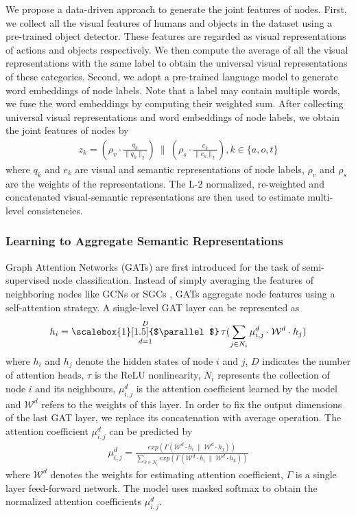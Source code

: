 \documentclass[sigconf,screen]{acmart}
\DeclareMathOperator*{\concat}{\scalebox{1}[1.5]{$\parallel$}}
\begin{document}
We propose a data-driven approach to generate the joint features of nodes. First, we collect all the visual features of humans and objects in the dataset using a pre-trained object detector. These features are regarded as visual representations of actions and objects respectively. We then compute the average of all the visual representations with the same label to obtain the universal visual representations of these categories. Second, we adopt a pre-trained language model to generate word embeddings of node labels. Note that a label may contain multiple words, we fuse the word embeddings by computing their weighted sum. After collecting universal visual representations and word embeddings of node labels, we obtain the joint features of nodes by
\begin{gather}
z_k = (\rho_v \cdot \frac{q_k}{\|q_k\|_2})\ \|\ (\rho_s \cdot \frac{e_k}{\|e_k\|_2}), k \in \{a, o, t\}
\end{gather}
where $q_k$ and $e_k$ are visual and semantic representations of node labels, $\rho_v$ and $\rho_s$ are the weights of the representations. The L-2 normalized, re-weighted and concatenated visual-semantic representations are then used to estimate multi-level consistencies.

\subsubsection{Learning to Aggregate Semantic Representations}

Graph Attention Networks (GATs) \cite{velickovic2018graph} are first introduced for the task of semi-supervised node classification. Instead of simply averaging the features of neighboring nodes like GCNs \cite{kipf2016semi} or SGCs \cite{wu2019simplifying}, GATs aggregate node features using a self-attention strategy. A single-level GAT layer can be represented as
\begin{gather}
h_i = \concat^D_{d = 1} \tau(\sum_{j \in N_i} \mu^d_{i, j} \cdot \mathcal{W}^d \cdot h_j)
\end{gather}
where $h_i$ and $h_j$ denote the hidden states of node $i$ and $j$, $D$ indicates the number of attention heads, $\tau$ is the ReLU nonlinearity, $N_i$ represents the collection of node $i$ and its neighbours, $\mu^d_{i, j}$ is the attention coefficient learned by the model and $\mathcal{W}^d$ refers to the weights of this layer. In order to fix the output dimensions of the last GAT layer, we replace its concatenation with average operation. The attention coefficient $\mu^d_{i, j}$ can be predicted by
\begin{gather}
\mu^d_{i, j} = \frac{exp(\Gamma(\mathcal{W}^d \cdot h_i\ \|\ \mathcal{W}^d \cdot h_j))}{\sum_{k \in N_i} exp(\Gamma(\mathcal{W}^d \cdot h_i\ \|\ \mathcal{W}^d \cdot h_k))}
\end{gather}
where $\mathcal{W}^d$ denotes the weights for estimating attention coefficient, $\Gamma$ is a single layer feed-forward network. The model uses masked softmax to obtain the normalized attention coefficients $\mu^d_{i, j}$.
\end{document}

